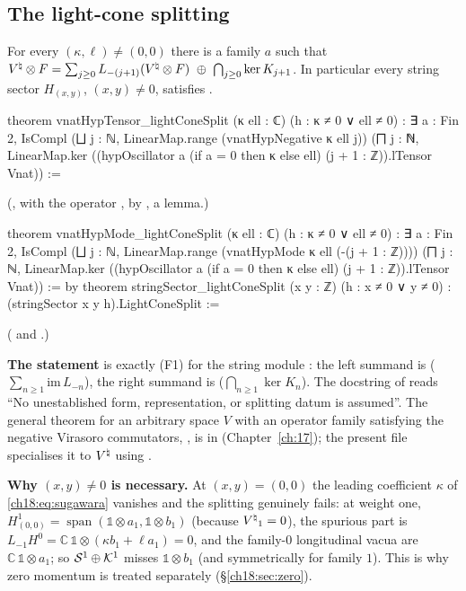 \subsection{The light-cone splitting}

\begin{theorem}\label{ch18:thm:F1}
For every $(\kappa,\ell)\neq(0,0)$ there is a family $a$ such that
${V^{\natural}}\otimes F=\sum_{j\ge0}L_{-(j+1)}({V^{\natural}}\otimes F)\ \oplus\ \bigcap_{j\ge0}\ker K_{j+1}$.  In particular every
string sector $H_{(x,y)}$, $(x,y)\neq0$, satisfies .
\end{theorem}
\begin{leancode}
theorem vnatHypTensor_lightConeSplit (κ ell : ℂ) (h : κ ≠ 0 ∨ ell ≠ 0) :
    ∃ a : Fin 2, IsCompl (⨆ j : ℕ, LinearMap.range (vnatHypNegative κ ell j))
      (⨅ j : ℕ, LinearMap.ker
        ((hypOscillator a (if a = 0 then κ else ell) (j + 1 : ℤ)).lTensor Vnat)) :=
\end{leancode}
(, with  the operator
, by , a  lemma.)
\begin{leancode}
theorem vnatHypMode_lightConeSplit (κ ell : ℂ) (h : κ ≠ 0 ∨ ell ≠ 0) :
    ∃ a : Fin 2, IsCompl (⨆ j : ℕ, LinearMap.range (vnatHypMode κ ell (-(j + 1 : ℤ))))
      (⨅ j : ℕ, LinearMap.ker
        ((hypOscillator a (if a = 0 then κ else ell) (j + 1 : ℤ)).lTensor Vnat)) := by
theorem stringSector_lightConeSplit (x y : ℤ) (h : x ≠ 0 ∨ y ≠ 0) :
    (stringSector x y h).LightConeSplit :=
\end{leancode}
( and
.)
\begin{dictionary}
\textbf{The statement} is exactly (F1) for the string module : the left
summand is  ($\sum_{n\ge1}\mathrm{im}\,L_{-n}$), the right summand is 
($\bigcap_{n\ge1}\ker K_n$).  The docstring of  reads ``No
unestablished form, representation, or splitting datum is assumed''.  The general theorem for an
arbitrary space $V$ with an operator family satisfying the negative Virasoro commutators,
, is in
 (Chapter~\ref{ch:17}); the present file
specialises it to ${V^{\natural}}$ using .

\textbf{Why $(x,y)\neq0$ is necessary.}  At $(x,y)=(0,0)$ the leading coefficient $\kappa$ of
\eqref{ch18:eq:sugawara} vanishes and the splitting genuinely fails: at weight one,
$H^1_{(0,0)}=\operatorname{span}(\mathbb 1\otimes a_1,\mathbb 1\otimes b_1)$ (because ${V^{\natural}}_1=0$), the spurious part is
$L_{-1}H^0=\mathbb C\,\mathbb 1\otimes(\kappa b_1+\ell a_1)=0$, and the family-$0$ longitudinal vacua are
$\mathbb C\,\mathbb 1\otimes a_1$; so $\mathcal{S}^1\oplus\mathcal{K}^1$ misses $\mathbb 1\otimes b_1$ (and symmetrically for family $1$).  This is why zero momentum is treated separately (\S\ref{ch18:sec:zero}).
\end{dictionary}
